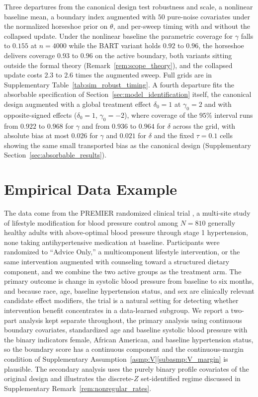 \documentclass[11pt]{article}
\theoremstyle{definition}
\theoremstyle{plain}
\begin{document}
Three departures from the canonical design test robustness and scale, a nonlinear baseline mean, a boundary index augmented with $50$ pure-noise covariates under the normalized horseshoe prior on $\theta$, and per-sweep timing with and without the collapsed update. Under the nonlinear baseline the parametric coverage for $\gamma$ falls to $0.155$ at $n=4000$ while the BART variant holds $0.92$ to $0.96$, the horseshoe delivers coverage $0.93$ to $0.96$ on the active boundary, both variants sitting outside the formal theory (Remark~\ref{rem:scope_theory}), and the collapsed update costs $2.3$ to $2.6$ times the augmented sweep. Full grids are in Supplementary Table~\ref{tab:sim_robust_timing}. A fourth departure fits the absorbable specification of Section~\ref{sec:model_identification} itself, the canonical design augmented with a global treatment effect $\delta_0=1$ at $\gamma_0=2$ and with opposite-signed effects ($\delta_0=1$, $\gamma_0=-2$), where coverage of the $95\%$ interval runs from $0.922$ to $0.968$ for $\gamma$ and from $0.936$ to $0.964$ for $\delta$ across the grid, with absolute bias at most $0.026$ for $\gamma$ and $0.021$ for $\delta$ and the fixed $\tau=0.1$ cells showing the same small transported bias as the canonical design (Supplementary Section~\ref{sec:absorbable_results}).


\section{Empirical Data Example}
\label{sec:analysis}
The data come from the PREMIER randomized clinical trial \citep{Svetkey2005}, a multi-site study of lifestyle modification for blood pressure control among $N=810$ generally healthy adults with above-optimal blood pressure through stage 1 hypertension, none taking antihypertensive medication at baseline. Participants were randomized to ``Advice Only,'' a multicomponent lifestyle intervention, or the same intervention augmented with counseling toward a structured dietary component, and we combine the two active groups as the treatment arm. The primary outcome is change in systolic blood pressure from baseline to six months, and because race, age, baseline hypertension status, and sex are clinically relevant candidate effect modifiers, the trial is a natural setting for detecting whether intervention benefit concentrates in a data-learned subgroup. We report a two-part analysis kept separate throughout, the primary analysis using continuous boundary covariates, standardized age and baseline systolic blood pressure with the binary indicators female, African American, and baseline hypertension status, so the boundary score has a continuous component and the continuous-margin condition of Supplementary Assumption~\ref{asmp:V}\ref{subasmp:V_margin} is plausible. The secondary analysis uses the purely binary profile covariates of the original design and illustrates the discrete-$Z$ set-identified regime discussed in Supplementary Remark~\ref{rem:nonregular_rates}.
\end{document}
